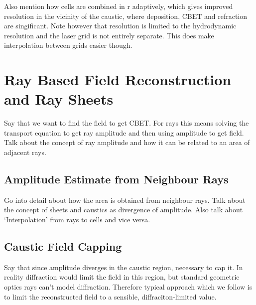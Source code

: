 Also mention how cells are combined in r adaptively, which gives improved resolution in the vicinity of the caustic, where deposition, CBET and refraction are singificant.
Note however that resolution is limited to the hydrodynamic resolution and the laser grid is not entirely separate.
This does make interpolation between grids easier though.

\section{Ray Based Field Reconstruction and Ray Sheets}
\label{sec:SOLAS_field_reconstruc}

Say that we want to find the field to get CBET.
For rays this means solving the transport equation to get ray amplitude and then using amplitude to get field.
Talk about the concept of ray amplitude and how it can be related to an area of adjacent rays.

\subsection{Amplitude Estimate from Neighbour Rays}

Go into detail about how the area is obtained from neighbour rays.
Talk about the concept of sheets and caustics as divergence of amplitude.
Also talk about `Interpolation' from rays to cells and vice versa.

\subsection{Caustic Field Capping}

Say that since amplitude diverges in the caustic region, necessary to cap it.
In reality diffraction would limit the field in this region, but standard geometric optics rays can't model diffraction.
Therefore typical approach which we follow is to limit the reconstructed field to a sensible, diffraciton-limited value.

